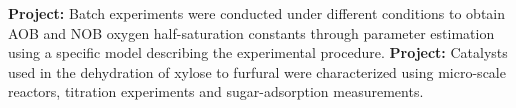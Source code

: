 \documentclass[11pt,a4paper,sans]{moderncv}
\begin{document}
{\begin{minipage}{\textwidth}
		\vspace{0.5cm}
		
		
		{\textbf{Project:} \small Batch experiments were conducted under different conditions to obtain AOB and NOB oxygen half-saturation constants through parameter estimation using a specific model describing the experimental procedure.}
		{\textbf{Project:} \small Catalysts used in the dehydration of xylose to furfural were characterized using micro-scale reactors, titration experiments and sugar-adsorption measurements.}
		\vspace{0.5cm}
	\end{minipage}
}
\end{document}
